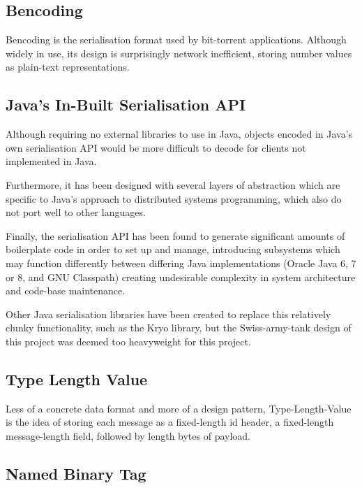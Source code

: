 \documentclass[12pt,a4paper,]{adreport}
\begin{document}
\subsection{Bencoding}\label{bencoding}

Bencoding is the serialisation format used by bit-torrent applications.
Although widely in use, its design is surprisingly network inefficient,
storing number values as plain-text representations.

\subsection{Java's In-Built Serialisation
API}\label{javas-in-built-serialisation-api}

Although requiring no external libraries to use in Java, objects encoded
in Java's own serialisation API would be more difficult to decode for
clients not implemented in Java.

Furthermore, it has been designed with several layers of abstraction
which are specific to Java's approach to distributed systems
programming, which also do not port well to other languages.

Finally, the serialisation API has been found to generate significant
amounts of boilerplate code in order to set up and manage, introducing
subsystems which may function differently between differing Java
implementations (Oracle Java 6, 7 or 8, and GNU Classpath) creating
undesirable complexity in system architecture and code-base maintenance.

Other Java serialisation libraries have been created to replace this
relatively clunky functionality, such as the Kryo \cite{kryo} library,
but the Swiss-army-tank design of this project was deemed too
heavyweight for this project.

\subsection{Type Length Value}\label{type-length-value}

Less of a concrete data format and more of a design pattern,
Type-Length-Value is the idea of storing each message as a fixed-length
id header, a fixed-length message-length field, followed by length bytes
of payload.

\subsection{Named Binary Tag}\label{named-binary-tag}
\end{document}
